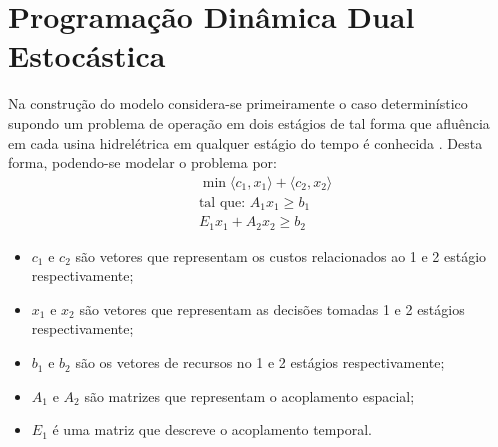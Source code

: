 \section{Programa\c c\~ao Din\^amica Dual Estoc\'astica}
Na constru\c c\~ao do modelo considera-se primeiramente o caso determin\'istico supondo um problema de opera\c
c\~ao em dois est\'agios de tal forma que 
aflu\^encia em cada usina hidrel\'etrica em qualquer est\'agio do tempo \'e conhecida \cite{cp}. Desta forma,
podendo-se modelar o problema por:
\pagebreak
\begin{align}
\label{t1}
&\min \langle c_1,x_1\rangle + \langle c_2,x_2\rangle \nonumber \\
&\mbox{tal que: }	A_1 x_1 \geq b_1 \\
&E_1 x_1 + A_2 x_2 \geq b_2 \nonumber
\end{align}
\begin{itemize}
  \item $c_1$ e $c_2$ s\~ao vetores que representam os custos relacionados ao 1 e 2 est\'agio respectivamente;
  \item $x_1$ e $x_2$ s\~ao vetores que representam as decis\~oes tomadas 1 e 2 est\'agios respectivamente;
  \item $b_1$ e $b_2$  s\~ao os vetores de recursos no 1 e 2 est\'agios respectivamente;
  \item $A_1$ e $A_2$ s\~ao matrizes que representam o acoplamento espacial;
  \item $E_1$ \'e uma matriz que descreve o acoplamento temporal.
\end{itemize}

